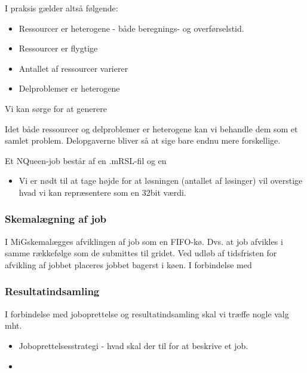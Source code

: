 \documentclass[draft,a4paper,10pt]{article}
\newcommand{\mig}{MiG}
\begin{document}
I praksis gælder altså følgende:
\begin{itemize}
	\item Ressourcer er heterogene - både beregnings- og overførselstid. 
	\item Ressourcer er flygtige
	\item Antallet af ressourcer varierer
	\item Delproblemer er heterogene
	\
\end{itemize}
 
Vi kan sørge for at generere 

Idet både ressourcer og delproblemer er heterogene kan vi behandle dem som et samlet problem. Delopgaverne bliver så at sige bare endnu mere forskellige.


Et NQueen-job består af en .mRSL-fil og en  

\begin{itemize}
\item{Vi er nødt til at tage højde for at løsningen (antallet af løsinger) vil overstige hvad vi kan repræsentere som en 32bit værdi. }
\end{itemize}

\subsubsection{Skemalægning af job}
I \mig skemalægges afviklingen af job som en FIFO-kø. Dvs. at job afvikles i samme rækkefølge som de submittes til gridet. Ved udløb af tidsfristen for afvikling af jobbet placeres jobbet bagerst i køen. I forbindelse med 

\subsubsection{Resultatindsamling}
I forbindelse med joboprettelse og resultatindsamling skal vi træffe nogle valg mht. 
\begin{itemize}
\item{Joboprettelsesstrategi - hvad skal der til for at beskrive et job.}
\item{}
\end{itemize}
\end{document}
